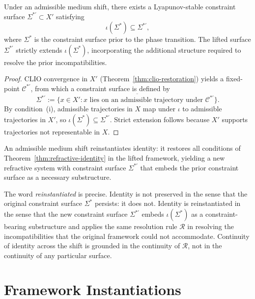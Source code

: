 \documentclass[11pt,openany]{book}
\begin{document}
\begin{corollary}
\label{cor:lifted-surface}
Under an admissible medium shift, there exists a
Lyapunov-stable constraint surface $\Sigma^{*\prime}
\subset X'$ satisfying
\[
  \iota(\Sigma^*) \subseteq \Sigma^{*\prime},
\]
where $\Sigma^*$ is the constraint surface prior to the
phase transition.  The lifted surface $\Sigma^{*\prime}$
strictly extends $\iota(\Sigma^*)$, incorporating the
additional structure required to resolve the prior
incompatibilities.
\end{corollary}

\begin{proof}
CLIO convergence in $X'$ (Theorem~\ref{thm:clio-restoration})
yields a fixed-point $\mathcal{C}^{*\prime}$, from which a
constraint surface is defined by
\[
  \Sigma^{*\prime} := \overline{\bigl\{x \in X' :
    x \text{ lies on an admissible trajectory under }
    \mathcal{C}^{*\prime}\bigr\}}.
\]
By condition~(i), admissible trajectories in $X$ map under
$\iota$ to admissible trajectories in $X'$, so
$\iota(\Sigma^*) \subseteq \Sigma^{*\prime}$.  Strict
extension follows because $X'$ supports trajectories not
representable in $X$.
\end{proof}

\begin{corollary}
\label{cor:identity-reinstated}
An admissible medium shift reinstantiates identity: it
restores all conditions of Theorem~\ref{thm:refractive-identity}
in the lifted framework, yielding a new refractive system
with constraint surface $\Sigma^{*\prime}$ that embeds the
prior constraint surface as a necessary substructure.
\end{corollary}

The word \emph{reinstantiated} is precise.  Identity is not
preserved in the sense that the original constraint surface
$\Sigma^*$ persists: it does not.  Identity is
reinstantiated in the sense that the new constraint surface
$\Sigma^{*\prime}$ embeds $\iota(\Sigma^*)$ as a
constraint-bearing substructure and applies the same
resolution rule $\mathcal{R}$ in resolving the
incompatibilities that the original framework could not
accommodate.  Continuity of identity across the shift is
grounded in the continuity of $\mathcal{R}$, not in the
continuity of any particular surface.

\section{Framework Instantiations}
\label{sec:instantiations}
\end{document}
